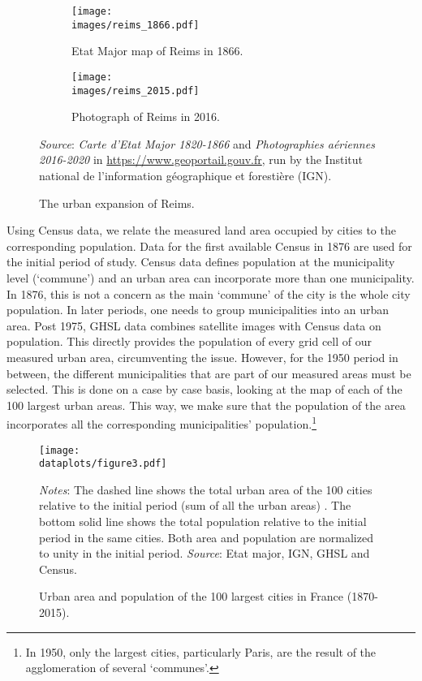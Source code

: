 \documentclass[./20250130-paper.tex]{subfiles}
\begin{document}
\begin{figure}
	\begin{subfigure}{0.5\textwidth}
		\texttt{[image: \\images/reims\_1866.pdf]}
		\caption{Etat Major map of Reims in 1866.\label{fig:reims1866}
		}
	\end{subfigure}%
	\hspace{5mm}
	\begin{subfigure}{0.5\textwidth}
		\texttt{[image: \\images/reims\_2015.pdf]}
		\caption{Photograph of Reims in 2016.\label{fig:reims2015}}
	\end{subfigure}
	\caption{The urban expansion of Reims.}
	{\footnotesize \textit{Source}: \emph{Carte d'Etat Major 1820-1866} and \emph{Photographies aériennes 2016-2020} in \url{https://www.geoportail.gouv.fr}, run by the Institut national de l’information géographique et forestière (IGN).}
\end{figure}


Using Census data, we relate the measured land area occupied by cities to the corresponding population. Data for the first available Census in 1876 are used for the initial period of study. Census data defines population at the municipality level (`commune') and an urban area can incorporate more than one municipality. In 1876, this is not a concern as the main `commune' of the city is the whole city population. In later periods, one needs to group municipalities into an urban area.  Post 1975, GHSL data combines satellite images with Census data on population. This directly provides the population of every grid cell of our measured urban area, circumventing the issue. However, for the 1950 period in between, the different municipalities that are part of our measured areas must be selected. This is done on a case by case basis, looking at the map of each of the 100 largest urban areas. This way, we make sure that the population of the area incorporates all the corresponding municipalities' population.\footnote{In 1950, only the largest cities, particularly Paris, are the result of the agglomeration of several `communes'.}  

\begin{figure}[p]	
	\begin{center}
		\texttt{[image: \\dataplots/figure3.pdf]}
	\end{center}
	\vspace{-0.5cm}
	\caption{Urban area and population of the 100 largest cities in France (1870-2015).\label{fig:areapop}
	}
	{\footnotesize \textit{Notes}: The dashed line shows the total urban area of the 100 cities relative to the initial period (sum of all the urban areas) . The bottom solid line shows the total population relative to the initial period in the same cities. Both area and population are normalized to unity in the initial period. 
		\textit{Source}:  Etat major, IGN, GHSL and Census.}%
\end{figure}
\end{document}
